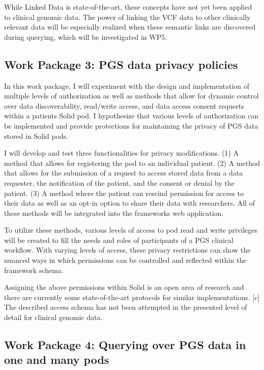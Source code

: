 \documentclass[runningheads]{llncs}
\begin{document}
While Linked Data is state-of-the-art, these concepts have not yet been applied to clinical genomic data.
The power of linking the VCF data to other clinically relevant data will be especially realized when these semantic links are discovered during querying, which will be investigated in WP5. 


\subsection{Work Package 3: PGS data privacy policies}

In this work package, I will experiment with the design and implementation of multiple levels of authorization as well as methods that allow for dynamic control over data discoverability, read/write access, and data access consent requests within a patient\textquotesingle s Solid pod. 
I hypothesize that various levels of authorization can be implemented and provide protections for maintaining the privacy of PGS data stored in Solid pods.

I will develop and test three functionalities for privacy modifications.
(1) A method that allows for registering the pod to an individual patient.
(2) A method that allows for the submission of a request to access stored data from a data requester, the notification of the patient, and the consent or denial by the patient.
(3) A method where the patient can rescind permission for access to their data as well as an opt-in option to share their data with researchers. 
All of these methods will be integrated into the framework\textquotesingle s web application.

To utilize these methods, various levels of access to pod read and write privileges will be created to fill the needs and roles of participants of a PGS clinical workflow. 
With varying levels of access, these privacy restrictions can show the nuanced ways in which permissions can be controlled and reflected within the framework schema.

Assigning the above permissions within Solid is an open area of research and there are currently some state-of-the-art protocols for similar implementations. [c]
The described access schema has not been attempted in the presented level of detail for clinical genomic data.


\subsection{Work Package 4: Querying over PGS data in one and many pods}
\end{document}

